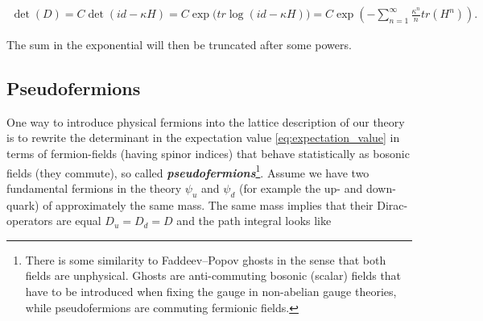 \documentclass{article}
\theoremstyle{plain} %
\theoremstyle{convention} %
\theoremstyle{remark} %
\def\df#1{\textbf{\textit{#1}}}
\numberwithin{equation}{section}
\begin{document}
\begin{align*}
    \det(D) = C \det(id - \kappa H) = C \exp\big(tr \log(id - \kappa H)\big) = C \exp(- \sum_{n=1}^{\infty} \frac{\kappa^n}{n} tr(H^n)).
\end{align*}

The sum in the exponential will then be truncated after some powers.

\subsection{Pseudofermions}

One way to introduce physical fermions into the lattice description of our theory is to rewrite the determinant in the expectation value \eqref{eq:expectation_value} in terms of fermion-fields (having spinor indices) that behave statistically as bosonic fields (they commute), so called \df{pseudofermions}\footnote{There is some similarity to Faddeev–Popov ghosts in the sense that both fields are unphysical. Ghosts are anti-commuting bosonic (scalar) fields that have to be introduced when fixing the gauge in non-abelian gauge theories, while pseudofermions are commuting fermionic fields.}. Assume we have two fundamental fermions in the theory $\psi_u$ and $\psi_d$ (for example the up- and down-quark) of approximately the same mass. The same mass implies that their Dirac-operators are equal $D_u = D_d = D$ and the path integral looks like
\end{document}
